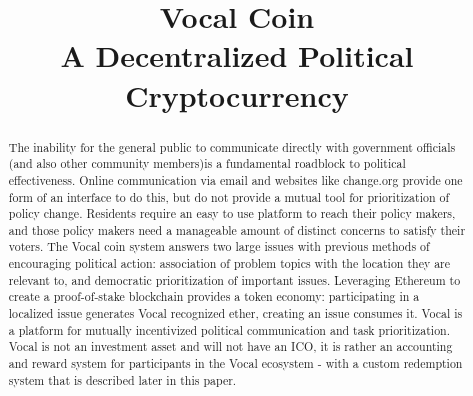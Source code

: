 \documentclass[conference]{IEEEtran}
\begin{document}
    \title{Vocal Coin\\ A Decentralized Political Cryptocurrency }
    
    \author{
        \and
    }

    \maketitle
    
    \begin{abstract}
      The inability for the general public to communicate directly with government officials (and also other community members)is a fundamental roadblock to political effectiveness. Online communication via email and websites like change.org provide one form of an interface to do this, but do not provide a mutual tool for prioritization of policy change. Residents require an easy to use platform to reach their policy makers, and those policy makers need a manageable amount of distinct concerns to satisfy their voters. The Vocal coin system answers two large issues with previous methods of encouraging political action: association of problem topics with the location they are relevant to, and democratic prioritization of important issues. Leveraging Ethereum to create a proof-of-stake blockchain provides a token economy: participating in a localized issue generates Vocal recognized ether, creating an issue consumes it. Vocal is a platform for mutually incentivized political communication and task prioritization. Vocal is not an investment asset and will not have an ICO, it is rather an accounting and reward system for participants in the Vocal ecosystem - with a custom redemption system that is described later in this paper.
    

    \end{abstract}
\end{document}
